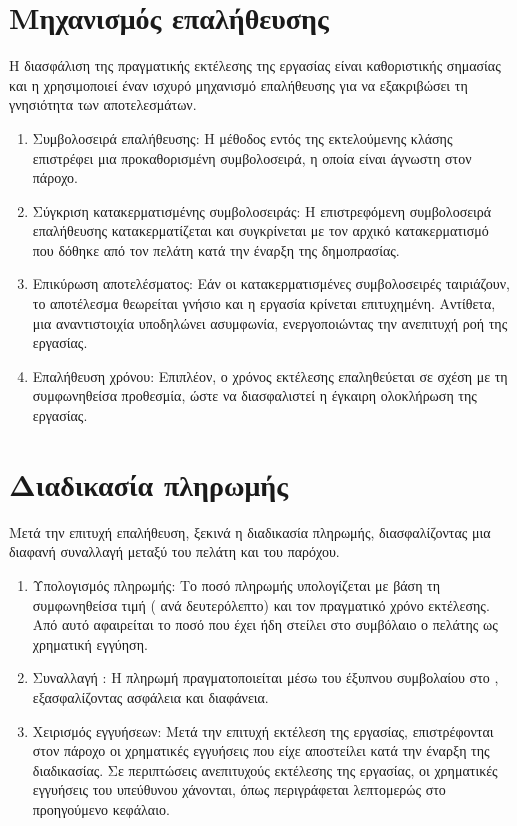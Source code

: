 \section{Μηχανισμός επαλήθευσης}
Η διασφάλιση της πραγματικής εκτέλεσης της εργασίας είναι καθοριστικής σημασίας και η  χρησιμοποιεί έναν ισχυρό μηχανισμό επαλήθευσης για να εξακριβώσει τη γνησιότητα των αποτελεσμάτων.

\begin{enumerate}
    \item Συμβολοσειρά επαλήθευσης: Η μέθοδος \textit{} εντός της εκτελούμενης κλάσης  επιστρέφει μια προκαθορισμένη συμβολοσειρά, η οποία είναι άγνωστη στον πάροχο.
    \item Σύγκριση κατακερματισμένης συμβολοσειράς: Η επιστρεφόμενη συμβολοσειρά επαλήθευσης κατακερματίζεται και συγκρίνεται με τον αρχικό κατακερματισμό που δόθηκε από τον πελάτη κατά την έναρξη της δημοπρασίας.
    \item Επικύρωση αποτελέσματος: Εάν οι κατακερματισμένες συμβολοσειρές ταιριάζουν, το αποτέλεσμα θεωρείται γνήσιο και η εργασία κρίνεται επιτυχημένη.
    Αντίθετα, μια αναντιστοιχία υποδηλώνει ασυμφωνία, ενεργοποιώντας την ανεπιτυχή ροή της εργασίας.
    \item Επαλήθευση χρόνου: Επιπλέον, ο χρόνος εκτέλεσης επαληθεύεται σε σχέση με τη συμφωνηθείσα προθεσμία, ώστε να διασφαλιστεί η έγκαιρη ολοκλήρωση της εργασίας.
\end{enumerate}

\section{Διαδικασία πληρωμής}
Μετά την επιτυχή επαλήθευση, ξεκινά η διαδικασία πληρωμής, διασφαλίζοντας μια διαφανή συναλλαγή μεταξύ του πελάτη και του παρόχου.

\begin{enumerate}
    \item Υπολογισμός πληρωμής: Το ποσό πληρωμής υπολογίζεται με βάση τη συμφωνηθείσα τιμή ( ανά δευτερόλεπτο) και τον πραγματικό χρόνο εκτέλεσης. Από αυτό αφαιρείται το ποσό που έχει ήδη στείλει στο συμβόλαιο ο πελάτης ως χρηματική εγγύηση.
    \item Συναλλαγή : Η πληρωμή πραγματοποιείται μέσω του έξυπνου συμβολαίου  στο , εξασφαλίζοντας ασφάλεια και διαφάνεια.
    \item Χειρισμός εγγυήσεων: Μετά την επιτυχή εκτέλεση της εργασίας, επιστρέφονται στον πάροχο οι χρηματικές εγγυήσεις που είχε αποστείλει κατά την έναρξη της διαδικασίας. Σε περιπτώσεις ανεπιτυχούς εκτέλεσης της εργασίας, οι χρηματικές εγγυήσεις του υπεύθυνου χάνονται, όπως περιγράφεται λεπτομερώς στο προηγούμενο κεφάλαιο.
\end{enumerate}

